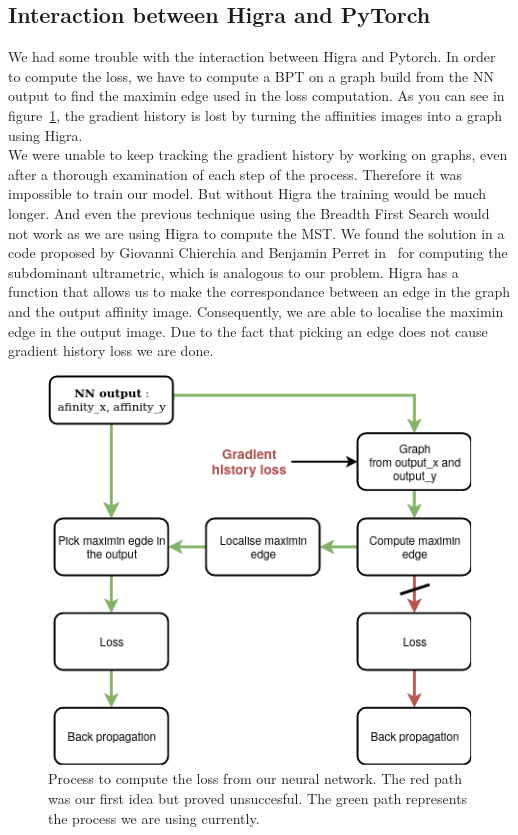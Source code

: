 \subsection{Interaction between Higra and PyTorch}

We had some trouble with the interaction between Higra and Pytorch. In order to
compute the loss, we have to compute a BPT on a graph build from the NN output
to find the maximin edge used in the loss computation. As you can see in
figure~\ref{fig:bpt_method}, the gradient history is lost by turning the
affinities images into a graph using Higra.\\
We were unable to keep tracking the gradient history by working on
graphs, even after a thorough examination of each step of the process. 
Therefore it was impossible to train our model. But without Higra the
training would be much longer. And even the previous technique using the
Breadth First Search would not work as we are using Higra to compute the MST.
We found the solution in a code proposed by Giovanni Chierchia and Benjamin
Perret in~\cite{chierchia_ultrametric_2019} for computing the subdominant
ultrametric, which is analogous to our problem. Higra has a function that
allows us to make the correspondance between an edge in the graph and the output
affinity image. Consequently, we are able to localise the maximin edge in the
output image. Due to the fact that picking an edge does not cause gradient
history loss we are done.

\begin{figure}[!htbp]
	\centering
	\includegraphics[width=0.6\linewidth]{./images/gradient_history.png}
	\caption{Process to compute the loss from our neural network. The red path
	was our first idea but proved unsuccesful. The green path represents the
process we are using currently.}
	\label{fig:bpt_method}
\end{figure}


